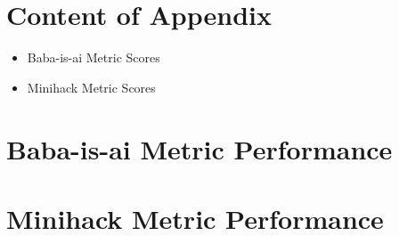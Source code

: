 \appendix

\appendix
\section*{Content of Appendix}
\begin{itemize}
    \item[\ref{appendix:babaisai}] Baba-is-ai Metric Scores
    \item[\ref{appendix:minihack}] Minihack Metric Scores
\end{itemize}

\section{Baba-is-ai Metric Performance}
\label{appendix:babaisai}


\section{Minihack Metric Performance}
\label{appendix:minihack}
